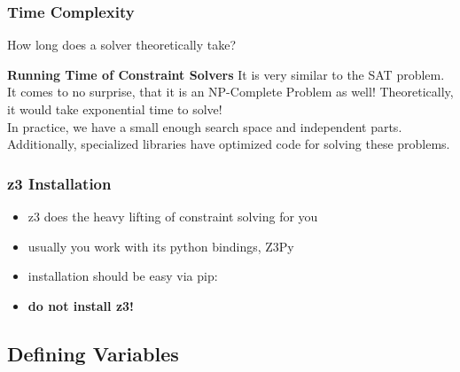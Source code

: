 \documentclass[aspectratio=169]{beamer}
\begin{document}
{\begin{frame}
    \frametitle{Time Complexity}
    How long does a solver theoretically take?
    \pause
    \begin{alertblock}{\textbf{Running Time of Constraint Solvers}}
        It is very similar to the SAT problem. It comes to no surprise, that it is an NP-Complete Problem as well!
        Theoretically, it would take exponential time to solve!\\
        In practice, we have a small enough search space and independent parts.
        Additionally, specialized libraries have optimized code for solving these problems.
    \end{alertblock}
\end{frame}

\begin{frame}[fragile]
    \frametitle{z3 Installation}
    \begin{itemize}
        \item z3 does the heavy lifting of constraint solving for you
        \item usually you work with its python bindings, Z3Py
        \item installation should be easy via pip: 
        \item \textbf{do not install z3!} 
    \end{itemize}

\end{frame}

\subsection{Defining Variables}

}
\end{document}
